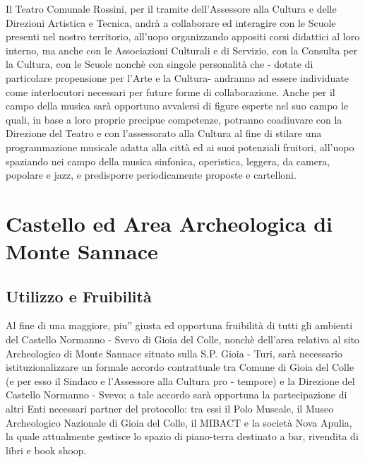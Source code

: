 \documentclass[a4paper,14pt,italian]{sphinxmanual}
\begin{document}
Il Teatro Comunale Rossini, per il tramite dell’Assessore alla Cultura e delle Direzioni Artistica e Tecnica, andrà a collaborare ed interagire con le Scuole presenti nel nostro territorio, all’uopo organizzando appositi corsi didattici al loro interno, ma anche con le Associazioni Culturali e di Servizio, con la Consulta per la Cultura, con le Scuole nonchè con singole personalità che - dotate di particolare propensione per l’Arte e la Cultura- andranno ad essere individuate come interlocutori necessari per future forme di collaborazione.
Anche per il campo della musica sarà opportuno avvalersi di figure esperte nel suo campo le quali, in base a loro proprie precipue competenze, potranno coadiuvare con la Direzione del Teatro e con l’assessorato alla Cultura al fine di stilare una programmazione musicale adatta alla città ed ai suoi potenziali fruitori, all’uopo spaziando nei campo della musica sinfonica, operistica, leggera, da camera, popolare e jazz, e predisporre periodicamente proposte e cartelloni.


\section{Castello ed Area Archeologica di Monte Sannace}
\label{\detokenize{cultura:castello-ed-area-archeologica-di-monte-sannace}}


\subsection{Utilizzo e Fruibilità}
\label{\detokenize{cultura:utilizzo-e-fruibilita}}
Al fine di una maggiore, piu” giusta ed opportuna fruibilità di tutti gli ambienti del Castello Normanno - Svevo di Gioia del Colle, nonchè dell’area relativa al sito Archeologico di Monte Sannace situato sulla S.P. Gioia - Turi, sarà necessario istituzionalizzare un formale accordo contrattuale tra Comune di Gioia del Colle (e per esso il Sindaco e l’Assessore alla Cultura pro - tempore) e la Direzione del Castello Normanno - Svevo; a tale accordo sarà opportuna la partecipazione di altri Enti necessari partner del protocollo: tra essi il Polo Museale, il Museo Archeologico Nazionale di Gioia del Colle, il MIBACT e la società Nova Apulia, la quale attualmente gestisce lo spazio di piano-terra destinato a bar, rivendita di libri e book shoop.
\end{document}
